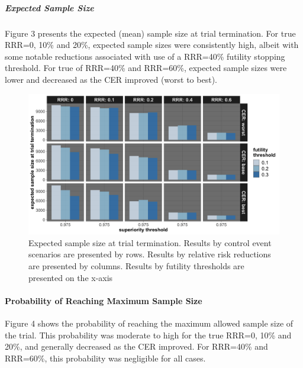 \documentclass[]{article}
\let\oldparagraph\paragraph
\renewcommand{\paragraph}[1]{\oldparagraph{#1}\mbox{}}
\let\oldsubparagraph\subparagraph
\renewcommand{\subparagraph}[1]{\oldsubparagraph{#1}\mbox{}}
\begin{document}
\clearpage

\hypertarget{expected-sample-size}{%
\subparagraph{Expected Sample Size}\label{expected-sample-size}}

Figure 3 presents the expected (mean) sample size at trial termination.
For true RRR=0, 10\% and 20\%, expected sample sizes were consistently
high, albeit with some notable reductions associated with use of a
RRR=40\% futility stopping threshold. For true of RRR=40\% and RRR=60\%,
expected sample sizes were lower and decreased as the CER improved
(worst to best).

\begin{figure}
  \caption{Expected sample size at trial termination. Results by control event scenarios are presented by rows. Results
  by relative risk reductions are presented by columns. Results by futility thresholds are presented on the x-axis}
  \includegraphics{../p1_plots/batch_size_nb_1000/exp_sample_size_p1.png}
\end{figure}

\clearpage

\hypertarget{probability-of-reaching-maximum-sample-size}{%
\paragraph{Probability of Reaching Maximum Sample
Size}\label{probability-of-reaching-maximum-sample-size}}

Figure 4 shows the probability of reaching the maximum allowed sample
size of the trial. This probability was moderate to high for the true
RRR=0, 10\% and 20\%, and generally decreased as the CER improved. For
RRR=40\% and RRR=60\%, this probability was negligible for all cases.
\end{document}
